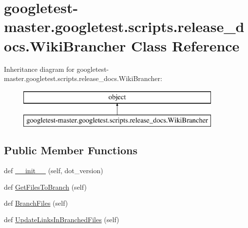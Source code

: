 \hypertarget{classgoogletest-master_1_1googletest_1_1scripts_1_1release__docs_1_1_wiki_brancher}{}\section{googletest-\/master.googletest.\+scripts.\+release\+\_\+docs.\+Wiki\+Brancher Class Reference}
\label{classgoogletest-master_1_1googletest_1_1scripts_1_1release__docs_1_1_wiki_brancher}
Inheritance diagram for googletest-\/master.googletest.\+scripts.\+release\+\_\+docs.\+Wiki\+Brancher\+:\begin{figure}[H]
\begin{center}
\leavevmode
\includegraphics[height=2.000000cm]{d2/de6/classgoogletest-master_1_1googletest_1_1scripts_1_1release__docs_1_1_wiki_brancher}
\end{center}
\end{figure}
\subsection*{Public Member Functions}
\begin{DoxyCompactItemize}
\item 
def \mbox{\hyperlink{classgoogletest-master_1_1googletest_1_1scripts_1_1release__docs_1_1_wiki_brancher_ac96d06932d054d883e66b5c5f7084a41}{\+\_\+\+\_\+init\+\_\+\+\_\+}} (self, dot\+\_\+version)
\item 
def \mbox{\hyperlink{classgoogletest-master_1_1googletest_1_1scripts_1_1release__docs_1_1_wiki_brancher_ad36eefddd7936a04248132136b7c0959}{Get\+Files\+To\+Branch}} (self)
\item 
def \mbox{\hyperlink{classgoogletest-master_1_1googletest_1_1scripts_1_1release__docs_1_1_wiki_brancher_a1c6cfd2499501b0dd36ac50ac02e575d}{Branch\+Files}} (self)
\item 
def \mbox{\hyperlink{classgoogletest-master_1_1googletest_1_1scripts_1_1release__docs_1_1_wiki_brancher_a065266f2db653141cfeaa6eb5ef5e358}{Update\+Links\+In\+Branched\+Files}} (self)
\end{DoxyCompactItemize}
